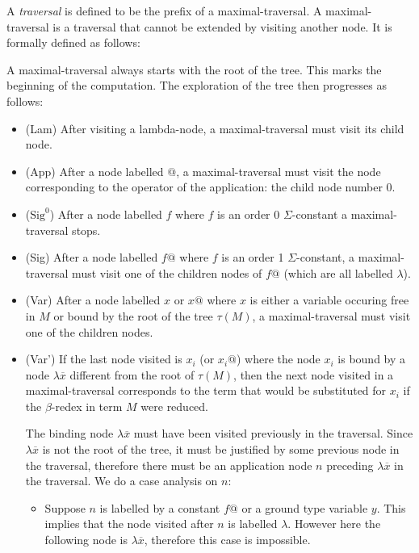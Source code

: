 A \emph{traversal} is defined to be the prefix of a maximal-traversal.
A maximal-traversal is a traversal that cannot be extended by visiting another node. It is formally defined as follows:
\begin{dfn}
\label{def:maxtraversal}
A maximal-traversal always starts with the root of the tree. This marks the beginning of the computation.
The exploration of the tree then progresses as follows:
\begin{itemize}
\item (Lam) After visiting a lambda-node, a maximal-traversal must visit its child node.

\item (App) After a node labelled $@$, a maximal-traversal must visit the node
corresponding to the operator of the application: the child node number $0$.

\item ($\mbox{Sig}^0$) After a node labelled $f$ where $f$ is an order 0 $\Sigma$-constant a maximal-traversal stops.

\item (Sig) After a node labelled $f@$ where $f$ is an order 1 $\Sigma$-constant,
a maximal-traversal must visit one of the children nodes of $f@$ (which are all labelled $\lambda$).

\item (Var) After a node labelled $x$ or $x@$ where $x$ is either a variable occuring free in $M$
or bound by the root of the tree $\tau(M)$, a maximal-traversal must visit one of the children nodes.

\item (Var') If the last node visited is $x_i$ (or $x_i@$) where the node $x_i$ is bound by a node $\lambda \overline{x}$
different from the root of $\tau(M)$, then the next node visited in a maximal-traversal
corresponds to the term that would be substituted for $x_i$ if the $\beta$-redex
in term $M$ were reduced.

The binding node $\lambda \overline{x}$ must have been visited previously in the traversal.
Since $\lambda \overline{x}$ is not the root of the tree, it must be justified by some previous node in the traversal,
therefore there must be an application node $n$ preceding $\lambda \overline{x}$ in the traversal. We do a case analysis
on $n$:

    \begin{itemize}
    \item Suppose $n$ is labelled by a constant $f@$ or a ground type variable $y$. This implies
    that the node visited after $n$ is labelled $\lambda$. However here the following node is $\lambda \overline{x}$,
    therefore this case is impossible.


\end{itemize}
\end{itemize}
\end{dfn}
